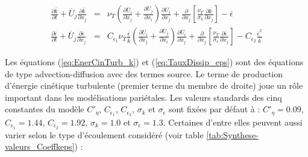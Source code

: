 \begin{subequations}

\begin{eqnarray}
\frac{\partial\overline{k}}{\partial t}+\overline{U}_{j}\frac{\partial\overline{k}}{\partial x_{j}} & = & \nu_{T}\left(\frac{\partial\overline{U}_{i}}{\partial x_{j}}+\frac{\partial\overline{U}_{j}}{\partial x_{i}}\right)\frac{\partial\overline{U}_{i}}{\partial x_{j}}+\frac{\partial}{\partial x_{j}}\left[\frac{\nu_{T}}{\sigma_{k}}\frac{\partial\overline{k}}{\partial x_{j}}\right]-\overline{\epsilon}\label{eq:EnerCinTurb_k}\\
\frac{\partial\overline{\epsilon}}{\partial t}+\overline{U}_{j}\frac{\partial\overline{\epsilon}}{\partial x_{j}} & = & C_{\epsilon_{1}}\nu_{T}\frac{\overline{\epsilon}}{\overline{k}}\left(\frac{\partial\overline{U}_{i}}{\partial x_{j}}+\frac{\partial\overline{U}_{j}}{\partial x_{i}}\right)\frac{\partial\overline{U}_{i}}{\partial x_{j}}+\frac{\partial}{\partial x_{j}}\left[\frac{\nu_{T}}{\sigma_{\epsilon}}\frac{\partial\overline{\epsilon}}{\partial x_{j}}\right]-C_{\epsilon_{2}}\frac{\overline{\epsilon}^{2}}{\overline{k}}\label{eq:TauxDissip_eps}
\end{eqnarray}


\end{subequations}

Les \'equations (\ref{eq:EnerCinTurb_k}) et (\ref{eq:TauxDissip_eps})
sont des \'equations de type advection-diffusion avec des termes source.
Le terme de production d\textquoteright \'energie cin\'etique turbulente
(premier terme du membre de droite) joue un r\^ole important dans les
mod\'elisations pari\'etales. Les valeurs standards des cinq constantes
du mod\`ele $C'_{\eta}$, $C_{\epsilon_{1}}$, $C_{\epsilon_{2}}$,
$\sigma_{k}$ et $\sigma_{\epsilon}$ sont fix\'ees par d\'efaut \`a : $C'_{\eta}=0.09$,
$C_{\epsilon_{1}}=1.44$, $C_{\epsilon_{2}}=1.92$, $\sigma_{k}=1.0$
et $\sigma_{\epsilon}=1.3$. Certaines d'entre elles peuvent aussi
varier selon le type d'\'ecoulement consid\'er\'e (voir table \ref{tab:Synthese-valeurs_Coeffkeps})
:

